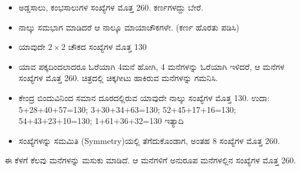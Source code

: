 \begin{itemize}
	\item ಅಡ್ಡಸಾಲು, ಕಂಭಸಾಲುಗಳ ಸಂಖ್ಯೆಗಳ ಮೊತ್ತ 260. ಕರ್ಣಗಳದ್ದು ಬೇರೆ.
	\item ನಾಲ್ಕು ಸಮಭಾಗ ಮಾಡಿದರೆ ಆ ನಾಲ್ಕೂ ಮಾಯಾಚೌಕಗಳೇ. (ಕರ್ಣ ಹೊರತು ಪಡಿಸಿ)
	\item ಯಾವುದೇ $2 \times 2$ ಚೌಕದ ಸಂಖ್ಯೆಗಳ ಮೊತ್ತ 130
	\item ಯಾವ ಪಕ್ಕದಿಂದಲಾದರೂ ಓರೆಯಾಗಿ 4ಮನೆ ಹೋಗಿ, 4 ಮನೆಗಳನ್ನು ಓರೆ\-ಯಾಗಿ ಇಳಿದರೆ, ಆ ಮನೆಗಳ ಸಂಖ್ಯೆಗಳ ಮೊತ್ತ 260. ಚಿತ್ರದಲ್ಲಿ ಚಿಕ್ಕಗೀಟು ಹಾಕಿರುವ ಮನೆಗಳನ್ನು ಗಮನಿಸಿ.
	\item ಕೇಂದ್ರ ಬಿಂದುವಿನಿಂದ ಸಮಾನ ದೂರದಲ್ಲಿರುವ ಯಾವುದೇ ನಾಲ್ಕು ಸಂಖ್ಯೆಗಳ ಮೊತ್ತ 130. ಉದಾ: 5+28+40+57=130; 3+30+34+63=130; 52+45+17+16=130; 54+43+23+10=130; 1+61+36+32=130 ಇತ್ಯಾದಿ
	\item ಸಂಖ್ಯೆಗಳನ್ನು ಸಮಮಿತಿ (Symmetry)ಯಲ್ಲಿ ತೆಗೆದುಕೊಂಡಾಗ, ಅಂತಹ 8 \linebreak ಸಂಖ್ಯೆಗಳ ಮೊತ್ತ 260.
\end{itemize}
ಈ ಕೆಳಗೆ ಕೆಲವು ಮನೆಗಳನ್ನು ಮಸುಕು ಮಾಡಿದೆ. ಆ ಮನೆಗಳಿಗೆ ಅನುರೂಪ ಮನೆಗಳಲ್ಲಿನ ಸಂಖ್ಯೆಗಳ ಮೊತ್ತ 260.
